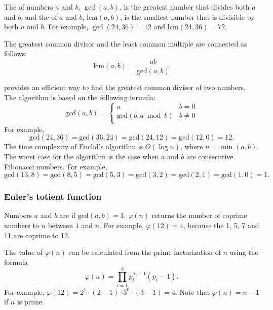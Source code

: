 
The  of
numbers $a$ and $b$, $\gcd(a,b)$,
is the greatest number that divides both $a$ and $b$,
and the  of
$a$ and $b$, $\textrm{lcm}(a,b)$,
is the smallest number that is divisible by
both $a$ and $b$.
For example,
$\gcd(24,36)=12$ and
$\textrm{lcm}(24,36)=72$.

The greatest common divisor and the least common multiple
are connected as follows:
\[\textrm{lcm}(a,b)=\frac{ab}{\textrm{gcd}(a,b)}\]

 provides an efficient way
to find the greatest common divisor of two numbers.
The algorithm is based on the following formula:
\begin{equation*}
    \textrm{gcd}(a,b) = \begin{cases}
               a        & b = 0\\
               \textrm{gcd}(b,a \bmod b) & b \neq 0\\
           \end{cases}
\end{equation*}
For example,
\[\textrm{gcd}(24,36) = \textrm{gcd}(36,24)
= \textrm{gcd}(24,12) = \textrm{gcd}(12,0)=12.\]
The time complexity of Euclid's algorithm
is $O(\log n)$, where $n=\min(a,b)$.
The worst case for the algorithm is
the case when $a$ and $b$ are consecutive Fibonacci numbers.
For example,
\[\textrm{gcd}(13,8)=\textrm{gcd}(8,5)
=\textrm{gcd}(5,3)=\textrm{gcd}(3,2)=\textrm{gcd}(2,1)=\textrm{gcd}(1,0)=1.\]

\subsubsection{Euler's totient function}


Numbers $a$ and $b$ are 
if $\textrm{gcd}(a,b)=1$.
 $\varphi(n)$
returns the number of coprime numbers to $n$
between $1$ and $n$.
For example, $\varphi(12)=4$,
because the 1, 5, 7 and 11
are coprime to 12.

The value of $\varphi(n)$ can be calculated
from the prime factorization of $n$
using the formula
\[ \varphi(n) = \prod_{i=1}^k p_i^{\alpha_i-1}(p_i-1). \]
For example, $\varphi(12)=2^1 \cdot (2-1) \cdot 3^0 \cdot (3-1)=4$.
Note that $\varphi(n)=n-1$ if $n$ is prime.

